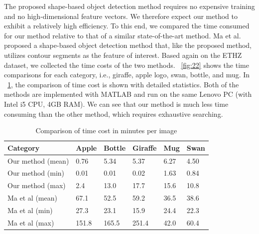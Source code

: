 \documentclass[journal]{IEEEtran}
\begin{document}
The proposed shape-based object detection method requires no expensive training and no high-dimensional feature vectors. We therefore expect our method to exhibit a relatively high efficiency. 
To this end, we compared the time consumed for our method relative to that of a similar state-of-the-art method. 
Ma et al. \cite{ma2011} proposed a shape-based object detection method that, 
like the proposed method, utilizes contour segments as the feature of interest. 
Based again on the ETHZ dataset, we collected the time costs of the two methods.
\figurename~\ref{fig:22} shows the time comparisons for each category, 
i.e., giraffe, apple logo, swan, bottle, and mug. 
In \tablename~\ref{tab:2}, the comparison of time cost is shown with detailed statistics.
Both of the methods are implemented with MATLAB and run on the same Lenovo PC (with Intel i5 CPU, 4GB RAM).
We can see that our method is much less time consuming than the other method, 
which requires exhaustive searching.

\begin{table}[!t]
\renewcommand{\arraystretch}{1.3}
\caption{Comparison of time cost in minutes per image}
\label{tab:2}
\centering
\scriptsize
\begin{tabular}{l|lllll}
\hline
Category & Apple & Bottle & Giraffe & Mug & Swan \\
\hline
Our method (mean)& 0.76 & 5.34 & 5.37 & 6.27 & 4.50 \\
Our method (min)& 0.01 & 0.01 & 0.02 & 1.63 & 0.84 \\
Our method (max)& 2.4 & 13.0 & 17.7 & 15.6 & 10.8 \\
\hline
Ma et al (mean)& 67.1 & 52.5 & 59.2 & 36.5 & 38.6 \\
Ma et al (min)& 27.3 & 23.1 & 15.9 & 24.4 & 22.3 \\
Ma et al (max)& 151.8 & 165.5 & 251.4 & 42.0 & 60.4 \\
\hline
\end{tabular}
\end{table}
\end{document}
